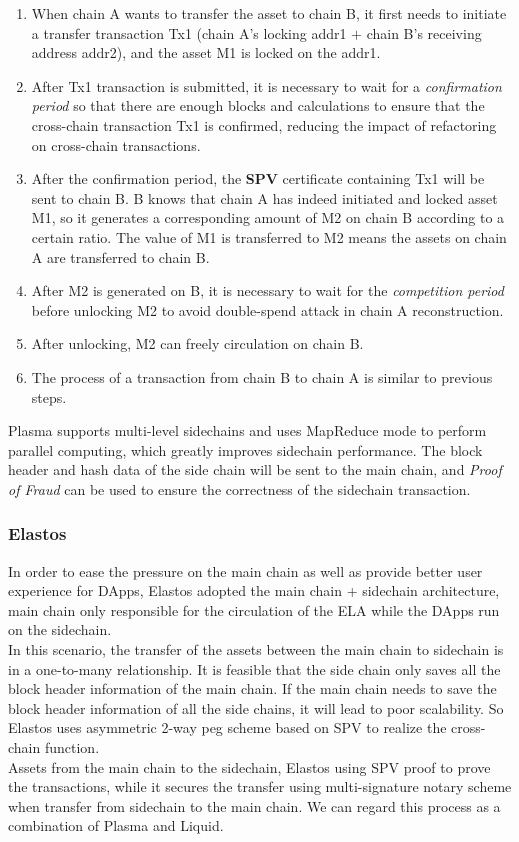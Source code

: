 \begin{enumerate}
    \item When chain A wants to transfer the asset to chain B, it first needs to initiate a transfer transaction Tx1 (chain A's locking addr1 $+$ chain B's receiving address addr2), and the asset M1 is locked on the addr1.
    \item After Tx1 transaction is submitted, it is necessary to wait for a \textit{confirmation period} so that there are enough blocks and calculations to ensure that the cross-chain transaction Tx1 is confirmed, reducing the impact of refactoring on cross-chain transactions.
    \item After the confirmation period, the \textbf{SPV} certificate containing Tx1 will be sent to chain B. B knows that chain A has indeed initiated and locked asset M1, so it generates a corresponding amount of M2 on chain B according to a certain ratio. The value of M1 is transferred to M2 means the assets on chain A are transferred to chain B.
    \item After M2 is generated on B, it is necessary to wait for the \textit{competition period} before unlocking M2 to avoid double-spend attack in chain A reconstruction.
    \item After unlocking, M2 can freely circulation on chain B.
    \item The process of a transaction from chain B to chain A is similar to previous steps.
\end{enumerate}
\noindent Plasma supports multi-level sidechains and uses MapReduce mode to perform parallel computing, which greatly improves sidechain performance. The block header and hash data of the side chain will be sent to the main chain, and \textit{Proof of Fraud} can be used to ensure the correctness of the sidechain transaction.



\subsubsection{Elastos}
\noindent In order to ease the pressure on the main chain as well as provide better user experience for DApps, Elastos\cite{Elastos} adopted the main chain + sidechain architecture,  main chain only responsible for the circulation of the ELA while the DApps run on the sidechain. \\
\noindent In this scenario, the transfer of the assets between the main chain to sidechain is in a one-to-many relationship. It is feasible that the side chain only saves all the block header information of the main chain. If the main chain needs to save the block header information of all the side chains, it will lead to poor scalability. So Elastos uses asymmetric 2-way peg scheme based on SPV to realize the cross-chain function.\\
\noindent Assets from the main chain to the sidechain, Elastos using SPV proof to prove the transactions, while it secures the transfer using multi-signature notary scheme when transfer from sidechain to the main chain. We can regard this process as a combination of Plasma and Liquid.


